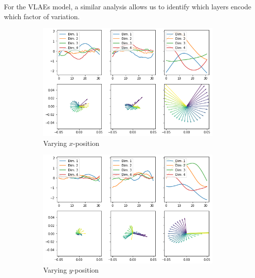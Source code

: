 For the \acp{VLAE} model, a similar analysis allows us to identify which layers encode which factor of variation.
\begin{figure}
    \centering
    \begin{subfigure}{.48\textwidth}
        \centering
        \includegraphics[width=\textwidth]{images/latent_space_traversals/vlae_dsprites_left_latent_space_values.png}
        \caption{Varying $x$-position}
        \label{subfig:vlae_dsprites_latent_space_values_x}
    \end{subfigure}
    \hfill
    \begin{subfigure}{.48\textwidth}
        \centering
        \includegraphics[width=\textwidth]{images/latent_space_traversals/vlae_dsprites_bottom_latent_space_values.png}
        \caption{Varying $y$-position}
        \label{subfig:vlae_dsprites_latent_space_values_y}
    \end{subfigure}
    \vfill
    \begin{subfigure}{.48\textwidth}

\end{subfigure}
\end{figure}
